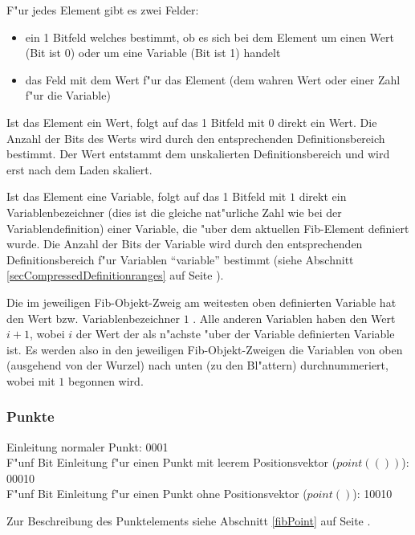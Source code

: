 \noindent\bigskip
F"ur jedes Element gibt es zwei Felder:
\begin{itemize}
 \item ein 1 Bitfeld welches bestimmt, ob es sich bei dem Element um einen Wert (Bit ist 0) oder um eine Variable (Bit ist 1) handelt
 \item das Feld mit dem Wert f"ur das Element (dem wahren Wert oder einer Zahl f"ur die Variable)
\end{itemize}

Ist das Element ein Wert, folgt auf das 1 Bitfeld mit $0$ direkt ein Wert. Die Anzahl der Bits des Werts wird durch den entsprechenden Definitionsbereich bestimmt. Der Wert entstammt dem unskalierten Definitionsbereich und wird erst nach dem Laden skaliert.

Ist das Element eine Variable, folgt auf das 1 Bitfeld mit $1$ direkt ein Variablenbezeichner (dies ist die gleiche nat"urliche Zahl wie bei der Variablendefinition) einer Variable, die "uber dem aktuellen Fib-Element definiert wurde. Die Anzahl der Bits der Variable wird durch den entsprechenden Definitionsbereich f"ur Variablen ``variable'' bestimmt (siehe Abschnitt \ref{secCompressedDefinitionranges} auf Seite \pageref{secCompressedDefinitionranges}).

Die im jeweiligen Fib-Objekt-Zweig am weitesten oben definierten Variable hat den Wert bzw. Variablenbezeichner $1$ . Alle anderen Variablen haben den Wert $i+1$, wobei $i$ der Wert der als n"achste "uber der Variable definierten Variable ist. Es werden also in den jeweiligen Fib-Objekt-Zweigen die Variablen von oben (ausgehend von der Wurzel) nach unten (zu den Bl"attern) durchnummeriert, wobei mit $1$ begonnen wird.


\subsubsection{Punkte}
\label{secCompressedPoint}

Einleitung normaler Punkt: 0001
\\\noindent
F"unf Bit Einleitung f"ur einen Punkt mit leerem Positionsvektor ($point(())$): 00010
\\\noindent
F"unf Bit Einleitung f"ur einen Punkt ohne Positionsvektor ($point()$): 10010

\bigskip\noindent
Zur Beschreibung des Punktelements siehe Abschnitt \ref{fibPoint} auf Seite \pageref{fibPoint} .

